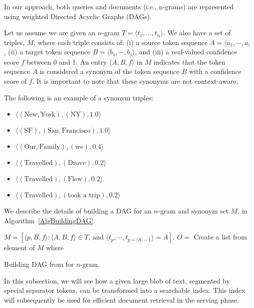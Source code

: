   In our approach, both queries and documents (i.e., n-grams) are represented using weighted Directed Acyclic Graphs (DAGs).

Let us assume we are given an $n$-gram $T=\langle t_1​,...,t_n\rangle$. We also have a set of triples, $M$, where each triple consists of: (i) a source token sequence $A=\langle a_1,\cdots,a_i$, (ii) a target token sequence $B=\langle b_1,\cdots,b_j\rangle$, and (iii) a real-valued confidence score $f$ between 0 and 1. An entry $\langle A, B, f\rangle$ in $M$ indicates that the token sequence $A$ is considered a synonym of the token sequence $B$ with a confidence score of $f$. It is important to note that these synonyms are not context-aware.
 
 \begin{Example} The following is an example of a synonym triples:
\begin{itemize}
  \item $\langle (\text{New}, \text{York}), (\text{NY}), 1.0\rangle$
  \item $\langle (\text{SF}), (\text{San}, \text{Francisco}), 1.0\rangle$
  \item $\langle (\text{Our}, \text{Family}), (\text{we}), 0.4\rangle$
  \item $\langle (\text{Travelled}), (\text{Drove}), 0.2\rangle$
  \item $\langle (\text{Travelled}), (\text{Flew}), 0.2\rangle$
  \item $\langle (\text{Travelled}), (\text{took a trip}), 0.2\rangle$
\end{itemize}
\end{Example}

We describe the details of building a DAG for an $n$-gram and synonym set $M$, in Algorithm~\ref{AlgBuildingDAG}. 

\begin{algorithm}[t]
\SetAlgoLined
{}

$M = [\langle p, B, f\rangle: \langle A, B, f\rangle \in T \text{, and } \langle t_p,\cdots,t_{p+|A|-1}\rangle = A]$. \;
$O = $ Create a list from element of $M$ where
\caption{Building DAG from for $n$-gram.}
\label{AlgBuildingDAG}
\end{algorithm}

In this subsection, we will see how a given large blob of text, segmented by special separator tokens, can be transformed into a searchable index. This index will subsequently be used for efficient document retrieval in the serving phase.

